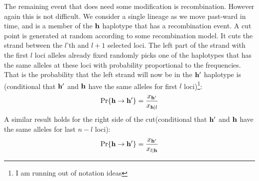 \documentclass{article}
\begin{document}
The remaining event that does need some modification is recombination. However
again this is not difficult. We consider a single lineage as we move past-ward
in time, and is a member of the $\mathbf{h}$ haplotype that has a recombination event.
A cut point is generated at random according to some recombination model. It
cuts the strand between the $l$'th and $l+1$ selected loci. The left part of
the strand with the first $l$ loci alleles already fixed randomly picks one of
the haplotypes that has the same alleles at these loci with probability
proportional to the frequencies. That is the probability that the left strand will
now be in the $\mathbf{h'}$ haplotype is (conditional that $\mathbf{h'}$ and $\mathbf{h}$ have the
same alleles for first $l$ loci)\footnote{I am running out of notation ideas}:
\begin{align}
	\Pr\{\mathbf{h} \to \mathbf{h'}\}=\frac{x_{\mathbf{h'}}}{x_{\mathbf{h}|l}}
\end{align}
A similar result holds for the right side of the cut(conditional that $\mathbf{h'}$
and $\mathbf{h}$ have the same alleles for last $n-l$ loci):
\begin{align}
	\Pr\{\mathbf{h} \to \mathbf{h'}\}=\frac{x_{\mathbf{h'}}}{x_{l|\mathbf{h}}}
\end{align}
\end{document}
